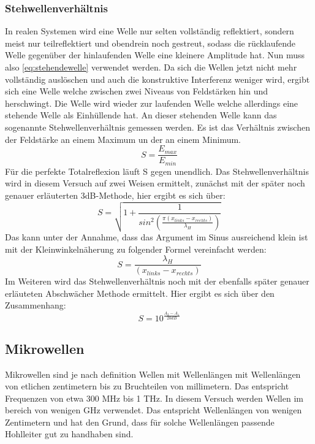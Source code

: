 \subsubsection{Stehwellenverhältnis}
\label{sec:thstehwelle}
In realen Systemen wird eine Welle nur selten vollständig reflektiert, sondern meist nur teilreflektiert
und obendrein noch gestreut, sodass die rücklaufende Welle gegenüber der hinlaufenden Welle eine
kleinere Amplitude hat. Nun muss also \autoref{eq:stehendewelle} verwendet werden. Da sich die Wellen 
jetzt nicht mehr vollständig auslöschen und auch die konstruktive Interferenz weniger wird, ergibt 
sich eine Welle welche zwischen zwei Niveaus von Feldstärken hin und herschwingt. Die Welle 
wird wieder zur laufenden Welle welche allerdings eine stehende Welle als Einhüllende hat.
An dieser stehenden Welle kann das sogenannte Stehwellenverhältnis gemessen werden. Es ist das 
Verhältnis zwischen der Feldstärke an einem Maximum un der an einem Minimum.
\begin{equation}
    \label{eq:stehwellenverhaeltnis}
    S=\frac{E_{max}}{E_{min}}
\end{equation}
Für die perfekte Totalreflexion läuft S gegen unendlich.
Das Stehwellenverhältnis wird in diesem Versuch auf zwei Weisen ermittelt, zunächst mit der
später noch genauer erläuterten 3dB-Methode, hier ergibt es sich über:
\begin{equation}
    \label{eq:dreidB}
    S=\sqrt{1+\frac{1}{sin^2(\frac{\pi (x_{links}-x_{rechts})}{\lambda_H})}}
\end{equation}
Das kann unter der Annahme, dass das Argument im Sinus ausreichend klein ist mit der Kleinwinkelnäherung zu folgender
Formel vereinfacht werden:
\begin{equation}
    \label{eq:3dBleicht}
    S=\frac{\lambda_H}{(x_{links}-x_{rechts})}
\end{equation}
Im Weiteren wird das Stehwellenverhältnis noch mit der ebenfalls später genauer erläuteten Abschwächer 
Methode ermittelt. Hier ergibt es sich über den Zusammenhang:
\begin{equation}
    S=10^{\frac{A_2-A_1}{20dB}}
\end{equation}

\subsection{Mikrowellen}
\label{sec:thallgemein}
Mikrowellen sind je nach definition Wellen mit Wellenlängen mit Wellenlängen von etlichen zentimetern bis
zu Bruchteilen von millimetern. Das entspricht Frequenzen von etwa 300 MHz bis 1 THz. In diesem Versuch werden
Wellen im bereich von wenigen GHz verwendet. Das entspricht Wellenlängen von wenigen Zentimetern und hat den
Grund, dass für solche Wellenlängen passende Hohlleiter gut zu handhaben sind.

